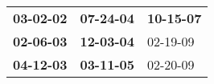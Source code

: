 \begin{supertabular}{p{0.33\columnwidth}p{0.33\columnwidth}p{0.33\columnwidth}}
 \textbf{03-02-02\textsuperscript{}} &  \textbf{07-24-04\textsuperscript{}} &  \textbf{10-15-07\textsuperscript{}} \\
 \textbf{02-06-03\textsuperscript{}} &  \textbf{12-03-04\textsuperscript{}} &           02-19-09\textsuperscript{} \\
 \textbf{04-12-03\textsuperscript{}} &  \textbf{03-11-05\textsuperscript{}} &           02-20-09\textsuperscript{} \\
\end{supertabular}
